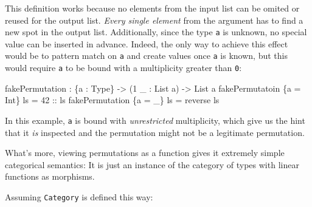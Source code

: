 \documentclass[
]{article}
\newenvironment{Shaded}{}{}
\newcommand{\DataTypeTok}[1]{\textcolor[rgb]{0.56,0.13,0.00}{#1}}
\newcommand{\DecValTok}[1]{\textcolor[rgb]{0.25,0.63,0.44}{#1}}
\newcommand{\FunctionTok}[1]{\textcolor[rgb]{0.02,0.16,0.49}{#1}}
\newcommand{\NormalTok}[1]{#1}
\newcommand{\OperatorTok}[1]{\textcolor[rgb]{0.40,0.40,0.40}{#1}}
\newcommand{\OtherTok}[1]{\textcolor[rgb]{0.00,0.44,0.13}{#1}}
\begin{document}
This definition works because no elements from the input list can be
omited or reused for the output list. \emph{Every single element} from
the argument has to find a new spot in the output list. Additionally,
since the type \texttt{a} is unknown, no special value can be inserted
in advance. Indeed, the only way to achieve this effect would be to
pattern match on \texttt{a} and create values once \texttt{a} is known,
but this would require \texttt{a} to be bound with a multiplicity
greater than \texttt{0}:

\begin{Shaded}
\begin{Highlighting}[]
\NormalTok{fakePermutation }\OperatorTok{:}\NormalTok{ \{a }\OperatorTok{:} \DataTypeTok{Type}\NormalTok{\} }\OtherTok{{-}\textgreater{}}\NormalTok{ (}\DecValTok{1}\NormalTok{ \_ }\OperatorTok{:} \DataTypeTok{List}\NormalTok{ a) }\OtherTok{{-}\textgreater{}} \DataTypeTok{List}\NormalTok{ a}
\NormalTok{fakePermutatoin \{a }\OtherTok{=} \DataTypeTok{Int}\NormalTok{\} ls }\OtherTok{=} \DecValTok{42}\OtherTok{ ::}\NormalTok{ ls}
\NormalTok{fakePermutation \{a }\OtherTok{=}\NormalTok{ \_\} ls }\OtherTok{=} \FunctionTok{reverse}\NormalTok{ ls}
\end{Highlighting}
\end{Shaded}

In this example, \texttt{a} is bound with \emph{unrestricted}
multiplicity, which give us the hint that it \emph{is} inspected and the
permutation might not be a legitimate permutation.

What's more, viewing permutations as a function gives it extremely
simple categorical semantics: It is just an instance of the category of
types with linear functions as morphisms.

Assuming \texttt{Category} is defined this way:
\end{document}
